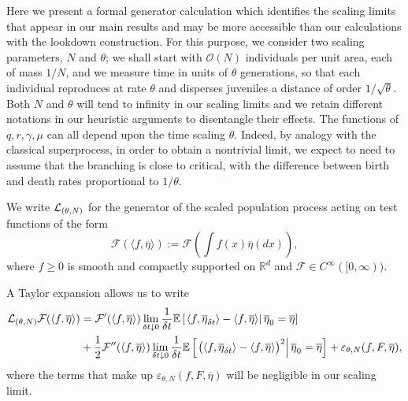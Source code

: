 \documentclass[12pt]{article}
\begin{document}
Here we present a formal generator calculation which identifies the scaling
limits that appear in our main results and may be more accessible than our 
calculations with the lookdown construction.
For this purpose, we consider two scaling parameters, $N$ and $\theta$;
we shall start with ${\mathcal O}(N)$ individuals per unit area,
each of mass $1/N$,
and we measure time in units of $\theta$ generations,
so that each individual reproduces at rate $\theta$
and disperses juveniles a distance of order $1/\sqrt{\theta}$.
Both $N$ and $\theta$ will tend to infinity in our scaling limits
and we retain different notations in our
heuristic arguments to disentangle their effects.
The functions of $q, r, \gamma, \mu$
can all depend upon the time scaling $\theta$.
Indeed, by analogy with the classical superprocess,
in order to obtain a nontrivial limit, 
we expect to need to assume that the branching is close to critical, with the
difference between birth and death rates proportional to $1/\theta$.

We write ${\cal L}_{(\theta, N)}$ for the generator of the scaled 
population process acting
on test functions of the form 
$$
    \mathcal{F}(\langle f,\overline{\eta}\rangle)
    :=
    \mathcal{F}\left(\int f(x)\overline{\eta}(dx)\right),
$$
where $f\geq 0$ is smooth and compactly supported on $\mathbb{R}^d$ and 
$ \mathcal{F} \in C^\infty ([0,\infty))$.

A Taylor expansion allows us to write
\begin{align}
    {\cal L}_{(\theta, N)} \mathcal{F}(\langle f,\overline{\eta}\rangle)
    &=
     \mathcal{F}'(\langle f,\overline{\eta}\rangle)
    \lim_{\delta t\downarrow 0}\frac{1}{\delta t}
    \mathbb{E}\left[ \left.
            \langle f, \overline{\eta}_{\delta t} \rangle -
            \langle f, \overline{\eta} \rangle
            \right|
            \overline{\eta}_0 = \overline{\eta}
        \right] \nonumber \\
    & {}
    + \frac{1}{2}
        \mathcal{F}''(\langle f,\overline{\eta}\rangle)
        \lim_{\delta t\downarrow 0}\frac{1}{\delta t}
        \mathbb{E}\left[\left.
            \big(\langle f,\overline{\eta}_{\delta t}\rangle -
            \langle f, \overline{\eta}\rangle\big)^2 \right|\overline{\eta}_0=\overline{\eta}
        \right]
    + \varepsilon_{\theta, N}(f, F, \overline{\eta}) ,
    \label{eq:expanmeanvar}
\end{align}
where the terms that make up 
$\varepsilon_{\theta, N}(f, F, \overline{\eta})$
will be negligible in our scaling limit. 
\end{document}
